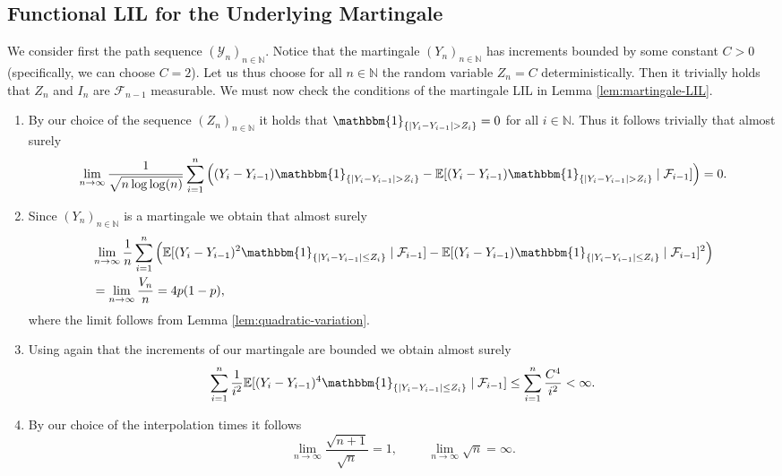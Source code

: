 \documentclass[11pt]{article}
\theoremstyle{remark}
\newcommand{\N}{\mathbb{N}}
\begin{document}
\subsection{Functional LIL for the Underlying Martingale}
We consider first the path sequence $(\mathcal{Y}_n)_{n\in\N}$. Notice that the martingale $(Y_n)_{n\in\N}$ has increments bounded by some constant $C>0$ (specifically, we can choose $C=2$). Let us thus choose for all $n\in\N$ the random variable $Z_n=C$ deterministically. Then it trivially holds that $Z_n$ and $I_n$ are $\mathcal{F}_{n-1}$ measurable. We must now check the conditions of the martingale LIL in Lemma \ref{lem:martingale-LIL}.

\begin{enumerate}
    \item By our choice of the sequence $(Z_n)_{n\in\N}$ it holds that $\mathbbm{1}_{\{|Y_i-Y_{i-1}|>Z_i\}}=0$ for all $i\in\N$. Thus it follows trivially that almost surely
    $$\lim_{n\rightarrow\infty}\frac{1}{\sqrt{n\log\log(n)}}\sum_{i=1}^n\left((Y_i-Y_{i-1})\mathbbm{1}_{\{|Y_i-Y_{i-1}|>Z_i\}}-\mathbb{E}[(Y_i-Y_{i-1})\mathbbm{1}_{\{|Y_i-Y_{i-1}|>Z_i\}}\;|\;\mathcal{F}_{i-1}]\right)=0.$$

    \item Since $(Y_n)_{n\in\N}$ is a martingale we obtain that almost surely
    \begin{align*}
    &\lim_{n\rightarrow\infty}\frac{1}{n}\sum_{i=1}^n\left(\mathbb{E}[(Y_i-Y_{i-1})^2\mathbbm{1}_{\{|Y_i-Y_{i-1}|\leq Z_i\}}\;|\;\mathcal{F}_{i-1}]-\mathbb{E}[(Y_i-Y_{i-1})\mathbbm{1}_{\{|Y_i-Y_{i-1}|\leq Z_i\}}\;|\;\mathcal{F}_{i-1}]^2\right)\\&=\lim_{n\rightarrow\infty}\frac{V_n}{n}=4p(1-p),
    \end{align*}
    where the limit follows from Lemma \ref{lem:quadratic-variation}.

    \item Using again that the increments of our martingale are bounded we obtain almost surely
    $$\sum_{i=1}^n\frac{1}{i^2}\mathbb{E}[(Y_i-Y_{i-1})^4\mathbbm{1}_{\{|Y_i-Y_{i-1}|\leq Z_i\}}\;|\;\mathcal{F}_{i-1}]\leq \sum_{i=1}^n\frac{C^4}{i^2}<\infty.$$

    \item By our choice of the interpolation times it follows
    $$\lim_{n\rightarrow\infty}\frac{\sqrt{n+1}}{\sqrt{n}}=1,\hspace{1cm}\lim_{n\rightarrow\infty}\sqrt{n}=\infty.$$
\end{enumerate}
\end{document}
